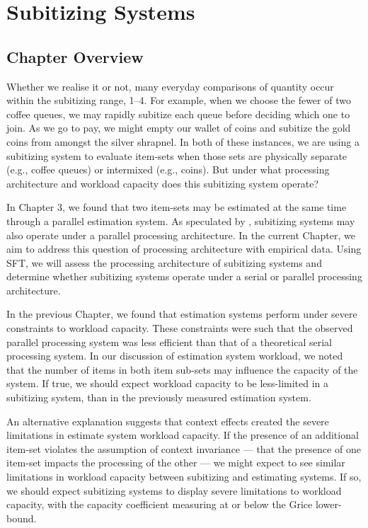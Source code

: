\chapter{Subitizing Systems} 

\label{Chapter 4}
\vspace{3cm}
\newpage

\section{Chapter Overview}
Whether we realise it or not, many everyday comparisons of quantity occur within the subitizing range, 1--4. For example, when we choose the fewer of two coffee queues, we may rapidly subitize each queue before deciding which one to join. As we go to pay, we might empty our wallet of coins and subitize the gold coins from amongst the silver shrapnel. In both of these instances, we are using a subitizing system to evaluate item-sets when those sets are physically separate (e.g., coffee queues) or intermixed (e.g., coins). But under what processing architecture and workload capacity does this subitizing system operate?

In Chapter 3, we found that two item-sets may be estimated at the same time through a parallel estimation system. As speculated by , subitizing systems may also operate under a parallel processing architecture. In the current Chapter, we aim to address this question of processing architecture with empirical data. Using SFT, we will assess the processing architecture of subitizing systems and determine whether subitizing systems operate under a serial or parallel processing architecture.

In the previous Chapter, we found that estimation systems perform under severe constraints to workload capacity. These constraints were such that the observed parallel processing system was less efficient than that of a theoretical serial processing system. In our discussion of estimation system workload, we noted that the number of items in both item sub-sets may influence the capacity of the system. If true, we should expect workload capacity to be less-limited in a subitizing system, than in the previously measured estimation system. 

An alternative explanation suggests that context effects created the severe limitations in estimate system workload capacity. If the presence of an additional item-set violates the assumption of context invariance --- that the presence of one item-set impacts the processing of the other --- we might expect to see similar limitations in workload capacity between subitizing and estimating systems. If so, we should expect subitizing systems to display severe limitations to workload capacity, with the capacity coefficient measuring at or below the Grice lower-bound. 

